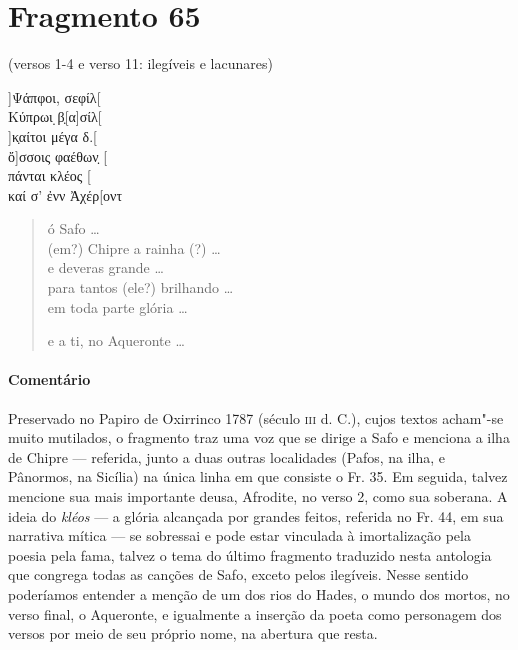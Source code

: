 \pagebreak


\section{Fragmento 65}

\begin{gkverse}
\textnormal{(versos 1-4 e verso 11: ilegíveis e lacunares)}

]Ψάπφοι, σεφίλ[\\
Κύπρωι ̣β̣[α]σίλ[\\
]κ̣αίτοι μέγα δ.[\\
ὄ]σσοις φαέθων̣ [\\
πάνται κλέος [\\
καί σ’ ἐνν Ἀχέρ[οντ 
\end{gkverse}

\begin{verse}
ó Safo \ldots{}\\
(em?) Chipre a rainha (?) \ldots{}\\
e deveras grande \ldots{}\\
para tantos (ele?) brilhando \ldots{}\\
em toda parte glória \ldots{}

e a ti, no Aqueronte \ldots{}\\
\end{verse}

{\paragraph{Comentário} Preservado no Papiro de Oxirrinco 1787  (século \textsc{iii} d. C.), cujos textos acham"-se muito mutilados, o fragmento traz uma voz que se dirige a Safo e menciona a ilha de Chipre --- referida, junto a duas outras localidades (Pafos, na ilha, e Pânormos, na Sicília) na única linha em que consiste o Fr. 35. Em seguida, talvez mencione sua mais importante deusa, Afrodite, no verso 2, como sua soberana. A ideia do \textit{kléos} --- a glória alcançada por grandes feitos, referida no Fr. 44, em sua narrativa mítica --- se sobressai e pode estar vinculada à imortalização pela poesia pela fama, talvez o tema do último fragmento traduzido nesta antologia que congrega todas as canções de Safo, exceto pelos ilegíveis. Nesse sentido poderíamos entender a menção de um dos rios do Hades, o mundo dos mortos, no verso final, o Aqueronte, e igualmente a inserção da poeta como personagem dos versos por meio de seu próprio nome, na abertura que resta.}

\pagebreak


